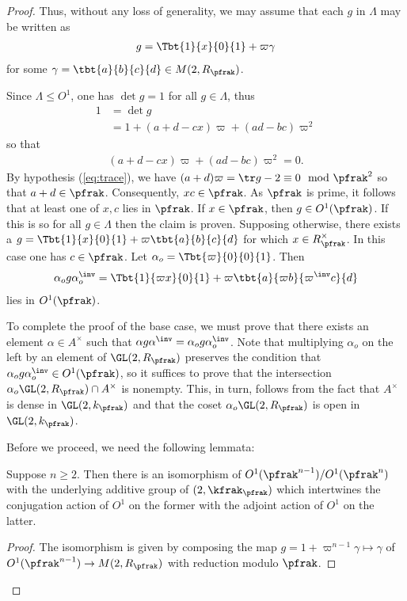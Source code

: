 \begin{proof}
    Thus, without any loss of generality, we may assume that each $g$ in $\Lambda$ may be written as
    \begin{align*}
        g = \Tbt{1}{x}{0}{1} + \varpi \gamma
    \end{align*}
    for some $\gamma = \tbt{a}{b}{c}{d} \in M(2, R_\pfrak)$.

    Since $\Lambda \leq O^1$, one has $\det g = 1 $ for all $g\in \Lambda$, thus
    \begin{align*}
        1 & = \det g                                     \\
          & = 1 + (a+d - cx ) \varpi + (ad -bc) \varpi^2
    \end{align*}
    so that
    \begin{align}\label{eq:MandarinLeyden}
        (a+d - cx) \varpi + (ad-bc) \varpi^2 =0.
    \end{align}
    By hypothesis (\ref{eq:trace}), we have $(a+d)\varpi = \tr g -2 \equiv 0 \mod \pfrak^2$ so that $a+d \in \pfrak$. Consequently, $xc \in \pfrak$. As $\pfrak$ is prime, it follows that at least one of $x,c$ lies in $\pfrak$. If $x \in \pfrak$, then $g \in O^1(\pfrak)$. If this is so for all $g \in \Lambda$ then the claim is proven. Supposing otherwise, there exists a $ g = \Tbt{1}{x}{0}{1} + \varpi \tbt{a}{b}{c}{d}$ for which $x \in R_\pfrak^\times$. In this case one has $c \in \pfrak$. Let $\alpha_o = \Tbt{\varpi}{0}{0}{1}$. Then
    \begin{align*}
        \alpha_o g\alpha_o^\inv  = \Tbt{1}{\varpi x}{0}{1} + \varpi \tbt{a}{\varpi b}{\varpi^\inv c}{d}
    \end{align*}
    lies in $O^1(\pfrak)$.

    To complete the proof of the base case, we must prove that there exists an element $\alpha \in A^\times $ such that $\alpha g \alpha^\inv =  \alpha_o g \alpha_o^\inv$. Note that multiplying $\alpha_o$ on the left by an element of $\GL(2,R_\pfrak)$ preserves the condition that $\alpha_o g \alpha_o^\inv \in O^1(\pfrak)$, so it suffices to prove that the intersection $\alpha_o \GL(2,R_\pfrak) \cap A^\times $ is nonempty. This, in turn, follows from the fact that $A^\times$ is dense in $\GL(2,k_\pfrak)$ and that the coset  $\alpha_o \GL(2,R_\pfrak)$ is open in $\GL(2,k_\pfrak)$.

    Before we proceed, we need the following lemmata:
    \begin{lemma}\label{lemma:iso}
        Suppose $n\geq 2$. Then there is an isomorphism of $O^1(\pfrak^{n-1}) / O^1(\pfrak^{n})$ with the underlying additive group of $\sl(2,\kfrak_\pfrak)$ which intertwines the conjugation action of $O^1$ on the former with the adjoint action of $O^1$ on the latter.
    \end{lemma}
    \begin{proof}
        The isomorphism is given by composing the map $g = 1 + \varpi^{n-1}\gamma \mapsto \gamma$  of $O^1(\pfrak^{n-1}) \to M(2,R_\pfrak)$ with reduction modulo $\pfrak$.
    \end{proof}


\end{proof}
